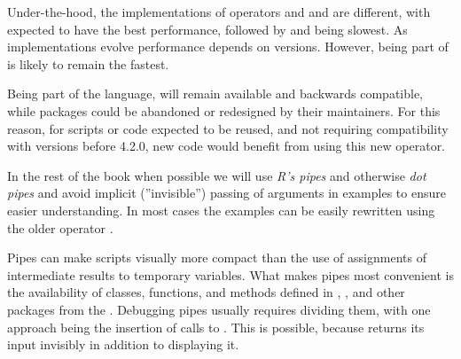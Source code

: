\documentclass[krantz2]{krantz}\usepackage{knitr}
\begin{document}
\begin{knitrout}\footnotesize
{}\color{fgcolor}
\end{knitrout}

Under-the-hood, the implementations of operators  \Roperator{|>} and \Roperator{\%>\%} and  are different, with \Roperator{|>} expected to have the best performance, followed by  and \Roperator{\%>\%} being slowest. As implementations evolve performance depends on versions. However, \Roperator{|>} being part of \Rlang is likely to remain the fastest.

Being part of the \Rlang language, \Roperator{|>} will remain available and backwards compatible, while packages could be abandoned or redesigned by their maintainers. For this reason, for scripts or code expected to be reused, and not requiring compatibility with \Rlang versions before 4.2.0, new code would benefit from using this new operator.

In the rest of the book when possible we will use \emph{R's pipes} and otherwise \emph{dot pipes} and avoid implicit (''invisible'') passing of arguments in examples to ensure easier understanding. In most cases the examples can be easily rewritten using the older operator \Roperator{\%>\%}.

Pipes can make scripts visually more compact than the use of assignments of intermediate results to temporary variables. What makes pipes most convenient is the availability of classes, functions, and methods defined in , , and other packages from the . Debugging pipes usually requires dividing them, with one approach being the insertion of calls to . This is possible, because  returns its input invisibly in addition to displaying it.
\end{document}
